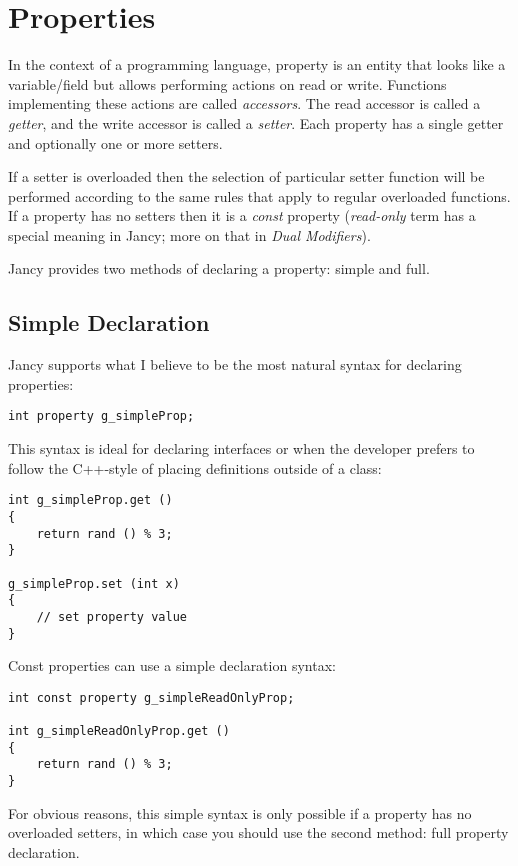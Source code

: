\documentclass[oneside]{book}
\begin{document}
\section{Properties}

In the context of a programming language, property is an entity that looks like a variable/field but allows performing actions on read or write. Functions implementing these actions are called \emph{accessors}. The read accessor is called a \emph{getter}, and the write accessor is called a \emph{setter}. Each property has a single getter and optionally one or more setters.

If a setter is overloaded then the selection of particular setter function will be performed according to the same rules that apply to regular overloaded functions. If a property has no setters then it is a \emph{const} property (\emph{read-only} term has a special meaning in Jancy; more on that in \emph{Dual Modifiers}).

Jancy provides two methods of declaring a property: simple and full.

\subsection{Simple Declaration}

Jancy supports what I believe to be the most natural syntax for declaring properties:

\begin{lstlisting}
int property g_simpleProp;
\end{lstlisting}

This syntax is ideal for declaring interfaces or when the developer prefers to follow the C++-style of placing definitions outside of a class:

\begin{lstlisting}
int g_simpleProp.get ()
{
    return rand () % 3;
}

g_simpleProp.set (int x)
{
    // set property value
}
\end{lstlisting}

Const properties can use a simple declaration syntax:

\begin{lstlisting}
int const property g_simpleReadOnlyProp;

int g_simpleReadOnlyProp.get ()
{
    return rand () % 3;
}
\end{lstlisting}

For obvious reasons, this simple syntax is only possible if a property has no overloaded setters, in which case you should use the second method: full property declaration.
\end{document}
